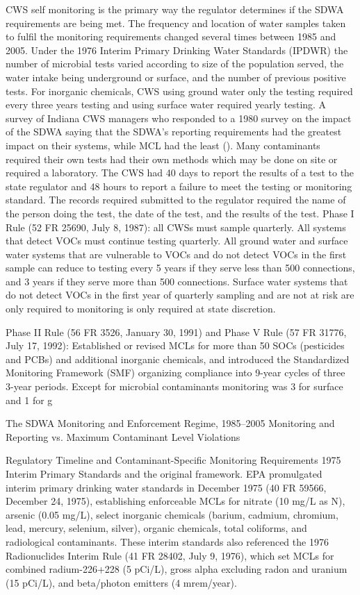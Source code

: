 CWS self monitoring is the primary way the regulator determines if the SDWA requirements are being met. The frequency and location of water samples taken to fulfil the monitoring requirements changed several times between 1985 and 2005. Under the 1976 Interim Primary Drinking Water Standards (IPDWR) the number of microbial tests varied according to size of the population served, the water intake being underground or surface, and the number of previous positive tests. For inorganic chemicals, CWS using ground water only the testing required every three years testing and using surface water required yearly testing. A survey of Indiana CWS managers who responded to a 1980 survey on the impact of the SDWA saying that the SDWA's reporting requirements had the greatest impact on their systems, while MCL had the least (\cite{oleckno1982national}). Many contaminants required their own tests had their own methods which may be done on site or required a laboratory. The CWS had 40 days to report the results of a test to the state regulator and 48 hours to report a failure to meet the testing or monitoring standard. The records required submitted to the regulator required the name of the person doing the test, the date of the test, and the results of the test. Phase I Rule (52 FR 25690, July 8, 1987): all CWSs must sample quarterly. All systems that detect VOCs must continue testing quarterly. All ground water and surface water systems that are vulnerable to VOCs and do not detect VOCs in the first sample can reduce to testing every 5 years if they serve less than 500 connections, and 3 years if they serve more than 500 connections. Surface water systems that do not detect VOCs in the first year of quarterly sampling and are not at risk are only required to monitoring is only required at state discretion.

Phase II Rule (56 FR 3526, January 30, 1991) and Phase V Rule (57 FR 31776, July 17, 1992): Established or revised MCLs for more than 50 SOCs (pesticides and PCBs) and additional inorganic chemicals, and introduced the Standardized Monitoring Framework (SMF) organizing compliance into 9-year cycles of three 3-year periods. Except for microbial contaminants monitoring was 3 for surface and 1 for g 

The SDWA Monitoring and Enforcement Regime, 1985–2005
Monitoring and Reporting vs. Maximum Contaminant Level Violations


Regulatory Timeline and Contaminant-Specific Monitoring Requirements
1975 Interim Primary Standards and the original framework. EPA promulgated interim primary drinking water standards in December 1975 (40 FR 59566, December 24, 1975), establishing enforceable MCLs for nitrate (10 mg/L as N), arsenic (0.05 mg/L), select inorganic chemicals (barium, cadmium, chromium, lead, mercury, selenium, silver), organic chemicals, total coliforms, and radiological contaminants. These interim standards also referenced the 1976 Radionuclides Interim Rule (41 FR 28402, July 9, 1976), which set MCLs for combined radium-226+228 (5 pCi/L), gross alpha excluding radon and uranium (15 pCi/L), and beta/photon emitters (4 mrem/year). 



